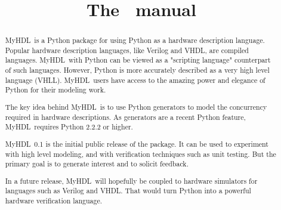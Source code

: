 \documentclass{manual}
\title{The \myhdl\ manual}
\newcommand{\myhdl}{{MyHDL}}
\begin{document}
\maketitle



\begin{abstract}

\noindent

\myhdl\ is a Python package for using Python as a hardware description
language. Popular hardware description languages, like Verilog and
VHDL, are compiled languages. \myhdl\ with Python can be viewed as a
"scripting language" counterpart of such languages. However, Python is
more accurately described as a very high level language
(VHLL). \myhdl\ users have access to the amazing power and elegance of
Python for their modeling work.

The key idea behind \myhdl\ is to use Python generators to model the
concurrency required in hardware descriptions. As generators are a
recent Python feature, \myhdl\ requires Python 2.2.2 or higher.

\myhdl\ 0.1 is the initial public release of the package. It can be
used to experiment with high level modeling, and with verification
techniques such as unit testing. But the primary goal is to generate
interest and to solicit feedback.

In a future release, \myhdl\ will hopefully be coupled to hardware
simulators for languages such as Verilog and VHDL. That would turn
Python into a powerful hardware verification language.

\end{abstract}

\tableofcontents






\end{document}
